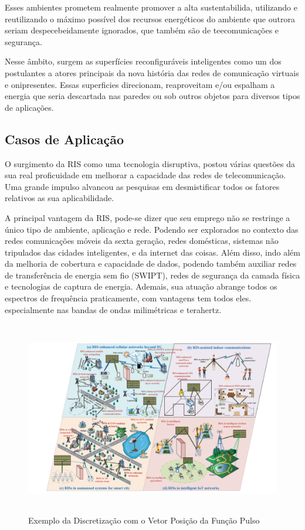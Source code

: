 \documentclass[
	12pt,				%
	openright,			%
	oneside,			%
	a4paper,			%
	english,			%
	brazil				%
	]{abntex2}
\begin{document}
Esses ambientes prometem realmente promover a alta sustentabilida, utilizando e reutilizando o máximo possível dos recursos energéticos do ambiente que outrora seriam despecebeidamente ignorados, que também são de teecomunicações e segurança.

Nesse âmbito, surgem as superfícies reconfiguráveis inteligentes como um dos postulantes a atores principais da nova história das redes de comunicação virtuais e onipresentes. Essas superficies direcionam, reaproveitam e/ou espalham a energia que seria descartada nas paredes ou sob outros objetos para diversos tipos de aplicações.

\subsection{Casos de Aplicação} 

O surgimento da RIS como uma tecnologia disruptiva, postou várias questões da sua real proficuidade em melhorar a capacidade das redes de telecomunicação. Uma grande impulso alvancou as pesquisas em desmistificar todos os fatores relativos as sua aplicabilidade.

A principal vantagem da RIS, pode-se dizer que seu emprego não se restringe a único tipo de ambiente, aplicação e rede. Podendo ser explorados no contexto das redes comunicações móveis da sexta geração, redes domésticas, sistemas não tripulados das cidades inteligentes, e da internet das coisas. Além disso,  indo além da melhoria de cobertura e capacidade de dados, podendo também auxiliar redes de transferência de energia sem fio (SWIPT), redes de segurança da camada física e tecnologias de captura de energia.
Ademais, sua atuação abrange todos os espectros de frequência praticamente, com vantagens tem todos eles. especialmente nas bandas de ondas milimétricas e terahertz.

\begin{figure}[htb]
 \label{PulsosVetorPosicaoIlustracao}
 \centering
  \begin{minipage}{\textwidth}
    \centering
    \caption{Exemplo da Discretização com o Vetor Posição da Função Pulso} \label{fig_minipage_imagem2}
    \includegraphics[width=14cm, height=8.5cm]{figures/RISusecases.png}
  \end{minipage}
  \hfill

\end{figure}
\end{document}
